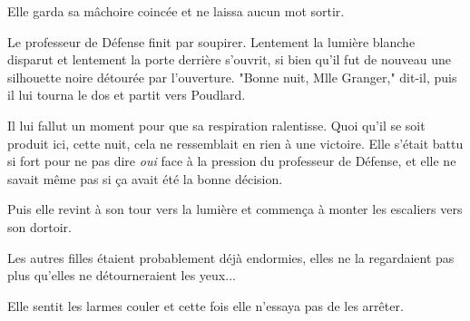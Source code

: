 Elle garda sa mâchoire coincée et ne laissa aucun mot sortir.

Le professeur de Défense finit par soupirer. Lentement la lumière blanche disparut et lentement la porte derrière s'ouvrit, si bien qu'il fut de nouveau une silhouette noire détourée par l'ouverture. "Bonne nuit, Mlle Granger," dit-il, puis il lui tourna le dos et partit vers Poudlard.

Il lui fallut un moment pour que sa respiration ralentisse. Quoi qu'il se soit produit ici, cette nuit, cela ne ressemblait en rien à une victoire. Elle s'était battu si fort pour ne pas dire \emph{oui}  face à la pression du professeur de Défense, et elle ne savait même pas si ça avait été la bonne décision.

Puis elle revint à son tour vers la lumière et commença à monter les escaliers vers son dortoir.

Les autres filles étaient probablement déjà endormies, elles ne la regardaient pas plus qu'elles ne détourneraient les yeux...

Elle sentit les larmes couler et cette fois elle n'essaya pas de les arrêter.

